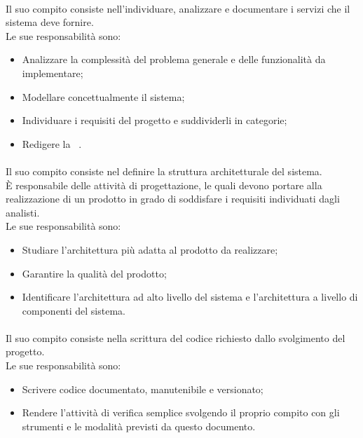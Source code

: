       \paragraph{\roleAnalyst}
        Il suo compito consiste nell'individuare, analizzare e documentare i servizi che il sistema deve fornire.\\
        Le sue responsabilità sono:
        \begin{itemize}
          \item Analizzare la complessità del problema generale e delle funzionalità da implementare;
          \item Modellare concettualmente il sistema;
          \item Individuare i requisiti del progetto e suddividerli in categorie;
          \item Redigere la \docNameVersionAdR\ .
        \end{itemize}
      
      \paragraph{\roleDesigner}
        Il suo compito consiste nel definire la struttura architetturale del sistema.\\
        È responsabile delle attività di progettazione, le quali devono portare alla realizzazione di un prodotto in grado di soddisfare i requisiti individuati dagli analisti.\\
        Le sue responsabilità sono:
        \begin{itemize}
          \item Studiare l'architettura più adatta al prodotto da realizzare;
          \item Garantire la qualità del prodotto;
          \item Identificare l'architettura ad alto livello del sistema e l'architettura a livello di componenti del sistema.
        \end{itemize}

      \paragraph{\roleProgrammer}
        Il suo compito consiste nella scrittura del codice richiesto dallo svolgimento del progetto.\\
        Le sue responsabilità sono:
        \begin{itemize}
          \item Scrivere codice documentato, manutenibile e versionato;
          \item Rendere l'attività di verifica semplice svolgendo il proprio compito con gli strumenti e le modalità previsti da questo documento.
        \end{itemize}

